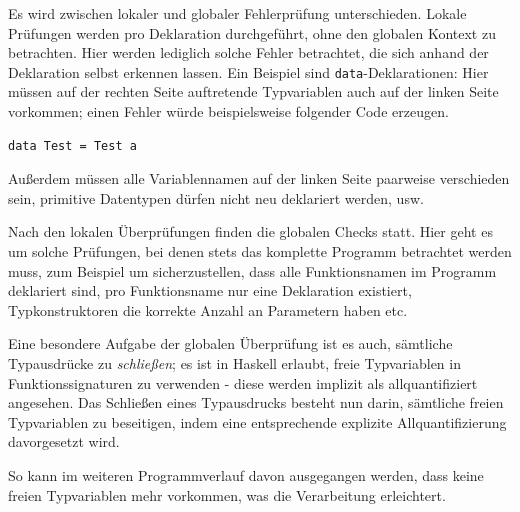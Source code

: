 Es wird zwischen lokaler und globaler Fehlerprüfung unterschieden. Lokale Prüfungen werden pro Deklaration durchgeführt,
ohne den globalen Kontext zu betrachten. Hier werden lediglich solche Fehler betrachtet, die sich anhand der Deklaration selbst
erkennen lassen. Ein Beispiel sind \texttt{data}-Deklarationen: Hier müssen auf der rechten Seite auftretende Typvariablen
auch auf der linken Seite vorkommen; einen Fehler würde beispielsweise folgender Code erzeugen.

\begin{verbatim}
data Test = Test a
\end{verbatim}

Außerdem müssen alle Variablennamen auf der linken Seite paarweise verschieden sein, primitive Datentypen dürfen nicht
neu deklariert werden, usw.

Nach den lokalen Überprüfungen finden die globalen Checks statt. Hier geht es um solche Prüfungen, bei denen stets das komplette
Programm betrachtet werden muss, zum Beispiel um sicherzustellen, dass alle Funktionsnamen im Programm deklariert sind,
pro Funktionsname nur eine Deklaration existiert, Typkonstruktoren die korrekte Anzahl an Parametern haben etc.

Eine besondere Aufgabe der globalen Überprüfung ist es auch, sämtliche Typausdrücke zu \textit{schließen}; es ist in Haskell
erlaubt, freie Typvariablen in Funktionssignaturen zu verwenden - diese werden implizit als allquantifiziert angesehen.
Das Schließen eines Typausdrucks besteht nun darin, sämtliche freien Typvariablen zu beseitigen, indem eine entsprechende
explizite Allquantifizierung davorgesetzt wird.

So kann im weiteren Programmverlauf davon ausgegangen werden, dass keine freien Typvariablen mehr vorkommen, was die
Verarbeitung erleichtert.



